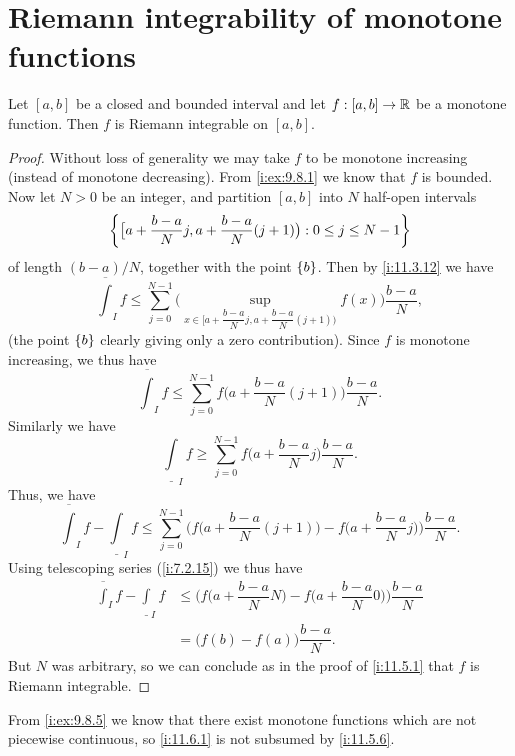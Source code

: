 \section{Riemann integrability of monotone functions}\label{i:sec:11.6}

\begin{prop}\label{i:11.6.1}
  Let \([a, b]\) be a closed and bounded interval and let \(f : [a, b] \to \mathbb{R}\) be a monotone function.
  Then \(f\) is Riemann integrable on \([a, b]\).
\end{prop}

\begin{proof}
  Without loss of generality we may take \(f\) to be monotone increasing (instead of monotone decreasing).
  From \cref{i:ex:9.8.1} we know that \(f\) is bounded.
  Now let \(N > 0\) be an integer, and partition \([a, b]\) into \(N\) half-open intervals
  \[
    \left\lbrace\big[a + \dfrac{b - a}{N} j, a + \dfrac{b - a}{N} (j + 1)\big) : 0 \leq j \leq N - 1\right\rbrace
  \]
  of length \((b - a) / N\), together with the point \(\left\lbrace b\right\rbrace\).
  Then by \cref{i:11.3.12} we have
  \[
    \overline{\int}_I f \leq \sum_{j = 0}^{N - 1} \Bigg(\sup_{x \in \big[a + \dfrac{b - a}{N} j, a + \dfrac{b - a}{N} (j + 1)\big)} f(x)\Bigg) \dfrac{b - a}{N},
  \]
  (the point \(\left\lbrace b\right\rbrace\) clearly giving only a zero contribution).
  Since \(f\) is monotone increasing, we thus have
  \[
    \overline{\int}_I f \leq \sum_{j = 0}^{N - 1} f\bigg(a + \dfrac{b - a}{N} (j + 1)\bigg) \dfrac{b - a}{N}.
  \]
  Similarly we have
  \[
    \underline{\int}_I f \geq \sum_{j = 0}^{N - 1} f\bigg(a + \dfrac{b - a}{N} j\bigg) \dfrac{b - a}{N}.
  \]
  Thus, we have
  \[
    \overline{\int}_I f - \underline{\int}_I f \leq \sum_{j = 0}^{N - 1} \Bigg(f\bigg(a + \dfrac{b - a}{N} (j + 1)\bigg) - f\bigg(a + \dfrac{b - a}{N} j\bigg)\Bigg) \dfrac{b - a}{N}.
  \]
  Using telescoping series (\cref{i:7.2.15}) we thus have
  \begin{align*}
    \overline{\int}_I f - \underline{\int}_I f & \leq \Bigg(f\bigg(a + \dfrac{b - a}{N} N\bigg) - f\bigg(a + \dfrac{b - a}{N} 0\bigg)\Bigg) \dfrac{b - a}{N} \\
                                               & = \big(f(b) - f(a)\big) \dfrac{b - a}{N}.
  \end{align*}
  But \(N\) was arbitrary, so we can conclude as in the proof of \cref{i:11.5.1} that \(f\) is Riemann integrable.
\end{proof}

\begin{rmk}\label{i:11.6.2}
  From \cref{i:ex:9.8.5} we know that there exist monotone functions which are not piecewise continuous, so \cref{i:11.6.1} is not subsumed by \cref{i:11.5.6}.
\end{rmk}

